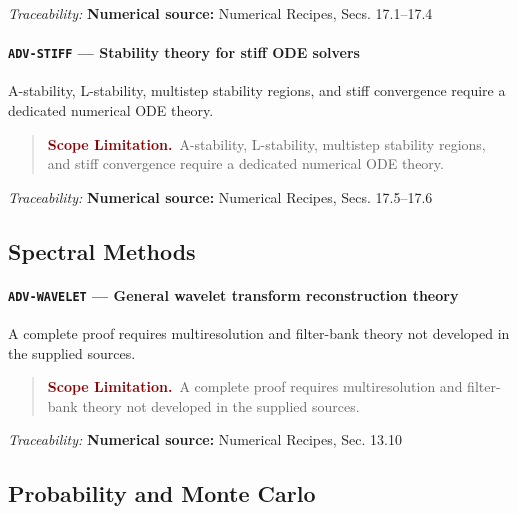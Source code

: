 \documentclass[10pt]{article}
\newcommand{\pidraw}[1]{\begingroup\urlstyle{tt}\nolinkurl{#1}\endgroup}
\theoremstyle{definition}
\theoremstyle{remark}
\newenvironment{scopelimitation}
{\begin{quote}\small\noindent\textbf{\textcolor{darkred}{Scope Limitation.}}\ }
{\end{quote}}
\begin{document}
\smallskip\noindent\textit{Traceability:} \textbf{Numerical source:} Numerical Recipes, Secs. 17.1--17.4\par

\label{prf:ADV-STIFF}

\paragraph{\pidraw{ADV-STIFF} --- Stability theory for stiff ODE solvers}

A-stability, L-stability, multistep stability regions, and stiff convergence require a dedicated numerical ODE theory.

\begin{scopelimitation}A-stability, L-stability, multistep stability regions, and stiff convergence require a dedicated numerical ODE theory.\end{scopelimitation}

\smallskip\noindent\textit{Traceability:} \textbf{Numerical source:} Numerical Recipes, Secs. 17.5--17.6\par

\subsection{Spectral Methods}

\label{prf:ADV-WAVELET}

\paragraph{\pidraw{ADV-WAVELET} --- General wavelet transform reconstruction theory}

A complete proof requires multiresolution and filter-bank theory not developed in the supplied sources.

\begin{scopelimitation}A complete proof requires multiresolution and filter-bank theory not developed in the supplied sources.\end{scopelimitation}

\smallskip\noindent\textit{Traceability:} \textbf{Numerical source:} Numerical Recipes, Sec. 13.10\par

\subsection{Probability and Monte Carlo}
\end{document}
